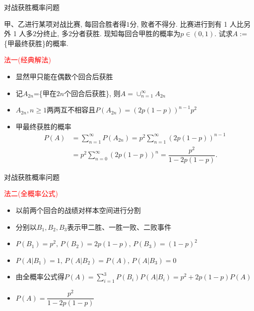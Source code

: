 \documentclass[Prob-All.tex]{subfiles}
\begin{document}
\begin{frame}{对战获胜概率问题}
	\begin{exam}
		甲、乙进行某项对战比赛, 每回合胜者得$1$分, 败者不得分. 比赛进行到有 1 人比另外 1 人多$2$分终止, 多$2$分者获胜. 现知每回合甲胜的概率为$p\in (0,1)$. 试求$A:=$\{甲最终获胜\}的概率.
	\end{exam}

	\begin{jieda}
		\textcolor{red}{法一(经典解法)}
		\begin{itemize}[<+-|alert@+>]
			\item 显然甲只能在偶数个回合后获胜
			\item 记$A_{2n}$=\{甲在$2n$个回合后获胜\}, \pause 则$A=\cup_{n=1}^\infty A_{2n}$\pause
			\item $A_{2n}, n\geq 1$两两互不相容且\pause $P(A_{2n})=(2p(1-p))^{n-1}p^2$
			\item 甲最终获胜的概率
			\begin{align*}
				P(A)&=\sum_{n=1}^{\infty}P(A_{2n})=p^2\sum_{n=1}^{\infty}(2p(1-p))^{n-1}\\
				&=p^2\sum_{n=0}^{\infty}(2p(1-p))^{n}=\dfrac{p^2}{1-2p(1-p)}.
			\end{align*}
		\end{itemize}
	\end{jieda}
\end{frame}

\begin{frame}{对战获胜概率问题}
	\begin{jieda}
		\textcolor{red}{法二(全概率公式)}
		\begin{itemize}[<+-|alert@+>]
			\item 以前两个回合的战绩对样本空间进行分割
			\item 分别以$B_1,B_2,B_3$表示甲二胜、一胜一败、二败事件
			\item $P(B_1)=p^2,\,P(B_2)=2p(1-p),\,P(B_3)=(1-p)^2$
			\item $P(A|B_1)=1,\,P(A|B_2)=P(A),\,P(A|B_3)=0$
			\item 由全概率公式得$P(A)=\sum\limits_{i=1}^{3}P(B_i)P(A|B_i)=p^2+2p(1-p)P(A)$
			\item $P(A)=\dfrac{p^2}{1-2p(1-p)}$
		\end{itemize}
	\end{jieda}
\end{frame}
\end{document}
